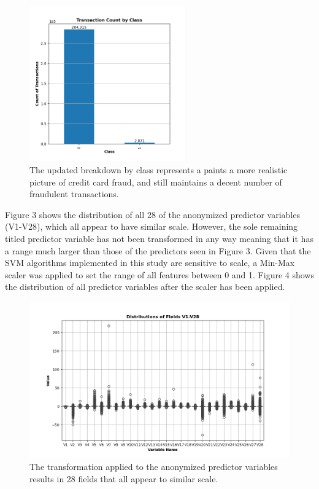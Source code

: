 \documentclass[11pt, oneside]{article}   	%
\begin{document}
\begin{figure}[h!]
    \centering
    \includegraphics[width=0.6\textwidth]{figures/fig_2.png}
    \captionsetup{font=small} 
    \caption{The updated breakdown by class represents a paints a more realistic picture of credit card fraud, and still maintains a decent number of fraudulent transactions.}
    \label{fig2}
\end{figure}

\noindent\hspace{10mm}Figure 3 shows the distribution of all 28 of the anonymized predictor variables (V1-V28), which all appear to have similar scale. However, the sole remaining titled predictor variable has not been transformed in any way meaning that it has a range much larger than those of the predictors seen in Figure 3. Given that the SVM algorithms implemented in this study are sensitive to scale, a Min-Max scaler was applied to set the range of all features between 0 and 1. Figure 4 shows the distribution of all predictor variables after the scaler has been applied. 

\begin{figure}[h!]
    \centering
    \includegraphics[width=1.0\textwidth]{figures/fig_3.png}
    \captionsetup{font=small} 
    \caption{The transformation applied to the anonymized predictor variables results in 28 fields that all appear to similar scale.}
    \label{fig3}
\end{figure}
\end{document}
